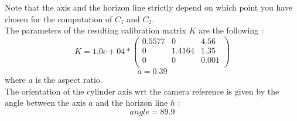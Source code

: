 \documentclass[a4paper, 11pt, oneside, openright, english]{book}
\begin{document}
Note that the axis and the horizon line strictly depend on which point you have chosen for the computation of $C_1$ and $C_2$.\\
The parameters of the resulting calibration matrix $K$ are the following : 
\[
    K = 1.0e+04* 
\begin{pmatrix}
    0.5577 & 0 & 4.56\\
    0  & 1.4164& 1.35 \\
    0  &  0  & 0.001 \\
\end{pmatrix} 
\]
\begin{equation}
    a = 0.39
\end{equation}
where $a$ is the aspect ratio.\\
The orientation of the cylinder axis wrt the camera reference is given by the angle between the axis $a$ and the horizon line $h$ : \\
\begin{equation}
    angle = 89.9
\end{equation}
\end{document}
